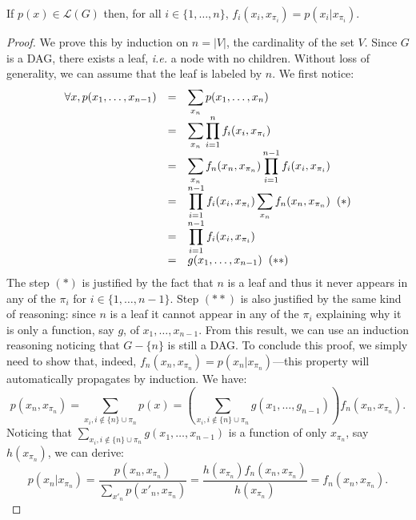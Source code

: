 \documentclass[12pt]{report}
\begin{document}
\begin{proposition}
If $p(x)\in\mathcal{L}(G)$ then, for all $i\in\{1,\dots,n\}$, $f_i(x_i, x_{\pi_i}) = p(x_i | x_{\pi_i})$.
\end{proposition}
\begin{proof}
We prove this by induction on $n = |V|$,  the cardinality of the set $V$. Since $G$ is a DAG, there exists a leaf, \emph{i.e.} a node with no children. Without loss of generality, we can assume that the leaf is labeled by $n$. We first notice: 
\begin{equation}
\begin{array}{r l l}
	\forall x, p(x_1, \dots, x_{n-1}) & = & \displaystyle\sum_{x_n} p(x_1, \dots, x_n) \\
																		 & = & \displaystyle\sum_{x_n} \prod_{i=1}^{n} f_i(x_i,x_{\pi_i}) \\
																		 & = & \displaystyle\sum_{x_n} f_n(x_n, x_{\pi_n})\prod_{i=1}^{n-1} f_i(x_i,x_{\pi_i}) \\
																		 & = & \displaystyle\prod_{i=1}^{n-1} f_i(x_i,x_{\pi_i}) \sum_{x_n} f_n(x_n, x_{\pi_n}) \hspace{0.2cm} (*)  \\
																		 & = & \displaystyle\prod_{i=1}^{n-1} f_i(x_i,x_{\pi_i}) \\
																		 & = & \displaystyle g(x_1, \dots, x_{n-1}) \hspace{0.2cm} (**)
\end{array}
\label{eq:}
\end{equation}
The step $(*)$ is justified by the fact that $n$ is a leaf and thus it never appears in any of the $\pi_i$ for $i\in\{1,\dots,n-1\}$. Step $(**)$ is also justified by the same kind of reasoning: since $n$ is a leaf it cannot appear in any of the $\pi_i$ explaining why it is only a function, say $g$, of $x_1,\dots, x_{n-1}$. From this result, we can use an induction reasoning noticing that $G - \{n\}$ is still a DAG. To conclude this proof, we simply need to show that, indeed, $f_n(x_n, x_{\pi_n}) = p(x_n | x_{\pi_n})$---this property will automatically propagates by induction. We have: 
\begin{equation}
p(x_n, x_{\pi_n}) = \sum_{x_i, i\notin \{n\}\cup \pi_n} p(x) = \left( \sum_{x_i, i\notin \{n\}\cup \pi_n} g(x_1, \dots, g_{n-1})\right)f_n(x_n, x_{\pi_n}).
\label{eq:}
\end{equation}
Noticing that $\sum_{x_i, i\notin \{n\}\cup \pi_n} g(x_1, \dots, x_{n-1})$ is a function of only $x_{\pi_n}$, say $h(x_{\pi_n})$, we can derive: 
\begin{equation}
p(x_n | x_{\pi_n}) = \frac{p(x_n, x_{\pi_n})}{\sum_{x'_n}p(x'_n, x_{\pi_n})} = \frac{h(x_{\pi_n}) f_n(x_n, x_{\pi_n})}{h(x_{\pi_n})} = f_n(x_n, x_{\pi_n}).
\label{eq:}
\end{equation}
\end{proof}
\end{document}
